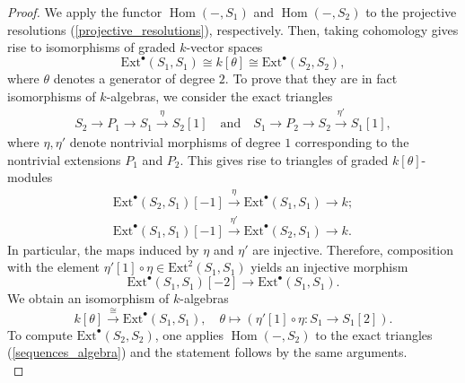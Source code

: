 \documentclass[10pt,a4paper]{amsart}
\DeclareMathOperator{\Hom}{Hom}
\begin{document}
\begin{proof}
    We apply the functor $\Hom(-, S_1)$ and $\Hom(-,S_2)$ to the projective resolutions (\ref{projective_resolutions}), respectively. Then, taking  cohomology gives rise to isomorphisms of graded $k$-vector spaces 
    \begin{equation*}
        \mathrm{Ext}^{\bullet}(S_1, S_1) \cong k[\theta] \cong \mathrm{Ext}^{\bullet}(S_2, S_2),
    \end{equation*}
    where $\theta$ denotes a generator of degree $2$.
    To prove that they are in fact isomorphisms of $k$-algebras, we consider the exact triangles
    \begin{equation}\label{sequences_algebra}
        \begin{aligned}
        S_2 \longrightarrow P_1 \longrightarrow S_1 \overset{\eta}{\longrightarrow} S_2[1]
        \quad \text{and} \quad 
        S_1 \longrightarrow P_2 \longrightarrow S_2 \overset{\eta'}{\longrightarrow} S_1[1],
        \end{aligned}
    \end{equation}
    where $\eta, \eta'$ denote nontrivial morphisms of degree $1$ corresponding to the nontrivial extensions $P_1$ and $P_2$. This gives rise to triangles of graded $k[\theta]$-modules
    \begin{equation*}
    \begin{aligned}
        \mathrm{Ext}^{\bullet}(S_2,S_1)[-1] \overset{\eta}{\longrightarrow} \mathrm{Ext}^{\bullet}(S_1,S_1) \longrightarrow k; \\
        \mathrm{Ext}^{\bullet}(S_1,S_1)[-1] \overset{\eta'}{\longrightarrow} \mathrm{Ext}^{\bullet}(S_2,S_1) \longrightarrow k.
    \end{aligned}
    \end{equation*}
    In particular, the maps induced by $\eta$ and $\eta'$ are injective. Therefore, composition with the element $\eta'[1]\circ\eta \in \mathrm{Ext}^{2}(S_1,S_1)$ yields an injective morphism 
    \begin{equation*}
        \mathrm{Ext}^{\bullet}(S_1,S_1)[-2] \longrightarrow \mathrm{Ext}^{\bullet}(S_1,S_1).
    \end{equation*}
    We obtain an isomorphism of $k$-algebras
    \begin{equation*}
        k[\theta] \overset{\cong}{\longrightarrow} \mathrm{Ext}^{\bullet}(S_1,S_1), \quad \theta \mapsto (\eta'[1] \circ\eta\colon S_1 \to S_1[2]).
    \end{equation*}
    To compute $\mathrm{Ext}^{\bullet}(S_2,S_2)$, one applies $\Hom(-,S_2)$ to the exact triangles (\ref{sequences_algebra}) and the statement follows by the same arguments. \\

\end{proof}
\end{document}
